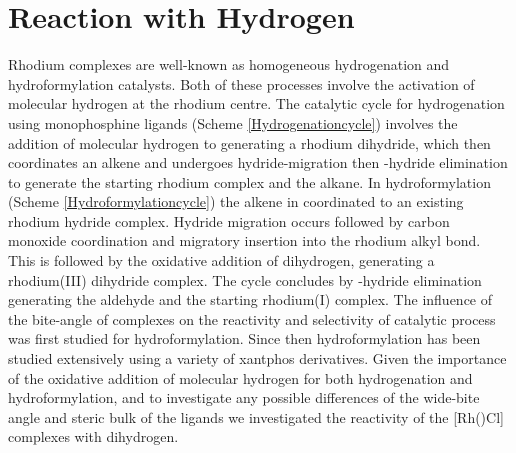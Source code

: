 
\section{Reaction with Hydrogen}
\label{section:rhodiumhydride}

Rhodium complexes are well-known as homogeneous hydrogenation and hydroformylation catalysts.  Both of these processes involve the activation of molecular hydrogen at the rhodium centre.  The catalytic cycle for hydrogenation using monophosphine ligands (Scheme \ref{Hydrogenationcycle}) involves the addition of molecular hydrogen to \ce{[Rh(PR3)2Cl]} generating a rhodium dihydride, which then coordinates an alkene and undergoes hydride-migration then \chembeta-hydride elimination to generate the starting rhodium complex and the alkane. In hydroformylation (Scheme \ref{Hydroformylationcycle}) the alkene in coordinated to an existing rhodium hydride complex.  Hydride migration occurs followed by carbon monoxide coordination and migratory insertion into the rhodium alkyl bond.  This is followed by the oxidative addition of dihydrogen, generating a rhodium(III) dihydride complex.  The cycle concludes by \chembeta-hydride elimination generating the aldehyde and the starting rhodium(I) complex.  The influence of the bite-angle of \Phxantphos{} complexes on the reactivity and selectivity of catalytic process was first studied for hydroformylation.\cite{Kranenburg1995}  Since then hydroformylation has been studied extensively using a variety of xantphos derivatives.\cite{Bronger2002, Bronger2003, Bronger2004, Bronger2004b, Bronger2004c, Buhling1997, Buhling1997b, Dieleman2001, Dierkes1999, Freixa2003, Goedheijt1998b, Kamer2001, Leclercq2005, Leeuwen1999, Leeuwen2000, Mora2007, Sandee1999, Silva2003, Veen1999, Veen2000, Vlugt2004, Zuidema2007, Zuidema2008, Zuidema2010}  Given the importance of the oxidative addition of molecular hydrogen for both hydrogenation and hydroformylation, and to investigate any possible differences of the wide-bite angle and steric bulk of the \tBuxantphos{} ligands we investigated the reactivity of the [Rh(\tBuxantphosk)Cl] complexes with dihydrogen.  

